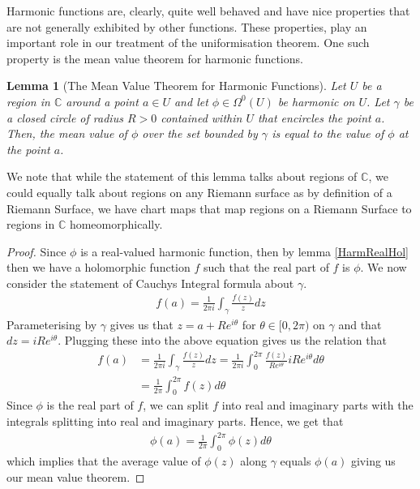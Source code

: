 \documentclass[11pt]{report}
\newtheorem{lemma}[thm]{Lemma}
\theoremstyle{definition}
\begin{document}
Harmonic functions are, clearly, quite well behaved and have nice properties that are not generally exhibited by other functions. These properties, play an important role in our treatment of the uniformisation theorem. One such property is the mean value theorem for harmonic functions.

\begin{lemma}[The Mean Value Theorem for Harmonic Functions]\label{MVT}
  Let $U$ be a region in $\mathbb{C}$ around a point $a \in U$ and let $\phi \in \Omega^0(U)$ be harmonic on $U$. Let $\gamma$ be a closed circle of radius $R > 0$ contained within $U$ that encircles the point $a$. Then, the mean value of $\phi$ over the set bounded by $\gamma$ is equal to the value of $\phi$ at the point $a$. 
\end{lemma}
We note that while the statement of this lemma talks about regions of $\mathbb{C}$, we could equally talk about regions on any Riemann surface as by definition of a Riemann Surface, we have chart maps that map regions on a Riemann Surface to regions in $\mathbb{C}$ homeomorphically. 
\begin{proof}
  Since $\phi$ is a real-valued harmonic function, then by lemma \ref{HarmRealHol} then we have a holomorphic function $f$ such that the real part of $f$ is $\phi$. We now consider the statement of Cauchys Integral formula about $\gamma$.
  \begin{align*}
    f(a) = \frac{1}{2\pi i}\int_{\gamma}\frac{f(z)}{z}dz
  \end{align*}
  Parameterising by $\gamma$ gives us that $z= a + Re^{i\theta}$ for $\theta \in [0, 2\pi)$ on $\gamma$ and that $dz = iRe^{i\theta}$. Plugging these into the above equation gives us the relation that
  \begin{align*}
    f(a) &= \frac{1}{2\pi i}\int_{\gamma}\frac{f(z)}{z}dz = \frac{1}{2\pi i}\int_0^{2\pi}\frac{f(z)}{Re^{i\theta}}iRe^{i\theta}d\theta \\
    &= \frac{1}{2\pi}\int_0^{2\pi}f(z)d\theta
  \end{align*}
  Since $\phi$ is the real part of $f$, we can split $f$ into real and imaginary parts with the integrals splitting into real and imaginary parts. Hence, we get that 
  \begin{align*}
    \phi(a)=\frac{1}{2\pi}\int_0^{2\pi}\phi(z)d\theta
  \end{align*}
    which implies that the average value of $\phi(z)$ along $\gamma$ equals $\phi(a)$ giving us our mean value theorem.
\end{proof}
\end{document}
